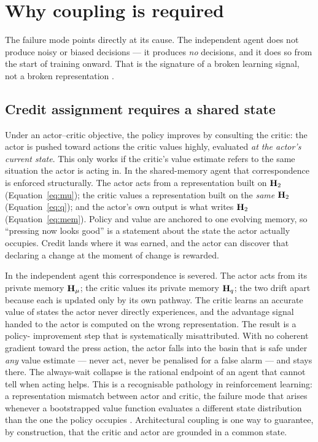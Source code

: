 \section{Why coupling is required}
\label{sec:mechanism}

The failure mode points directly at its cause. The independent agent does not
produce noisy or biased decisions --- it produces \emph{no} decisions, and it does
so from the start of training onward. That is the signature of a broken learning
signal, not a broken representation \citep{sutton2018reinforcement,
vanhasselt2018deep}.

\subsection{Credit assignment requires a shared state}
Under an actor--critic objective, the policy improves by consulting the critic: the
actor is pushed toward actions the critic values highly, evaluated \emph{at the
actor's current state}. This only works if the critic's value estimate refers to the
same situation the actor is acting in. In the shared-memory agent that
correspondence is enforced structurally. The actor acts from a representation built
on $\mathbf{H}_2$ (Equation~\ref{eq:mu}); the critic values a representation built on the
\emph{same} $\mathbf{H}_2$ (Equation~\ref{eq:q}); and the actor's own output is what writes
$\mathbf{H}_2$ (Equation~\ref{eq:mem}). Policy and value are anchored to one evolving
memory, so ``pressing now looks good'' is a statement about the state the actor
actually occupies. Credit lands where it was earned, and the actor can discover that
declaring a change at the moment of change is rewarded.

In the independent agent this correspondence is severed. The actor acts from its
private memory $\mathbf{H}_\mu$; the critic values its private memory $\mathbf{H}_q$; the two drift
apart because each is updated only by its own pathway. The critic learns an accurate
value of states the actor never directly experiences, and the advantage signal handed
to the actor is computed on the wrong representation. The result is a policy-
improvement step that is systematically misattributed. With no coherent gradient
toward the press action, the actor falls into the basin that is safe under \emph{any}
value estimate --- never act, never be penalised for a false alarm --- and stays
there. The always-wait collapse is the rational endpoint of an agent that cannot tell
when acting helps. This is a recognisable pathology in reinforcement learning: a
representation mismatch between actor and critic, the failure mode that arises
whenever a bootstrapped value function evaluates a different state distribution than
the one the policy occupies \citep{vanhasselt2018deep, fujimoto2018addressing}.
Architectural coupling is one way to guarantee, by construction, that the critic and
actor are grounded in a common state.

